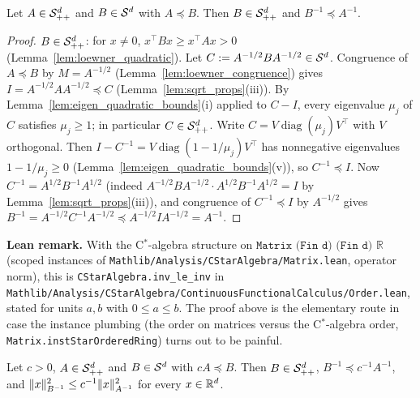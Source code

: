 \begin{lemma}\label{lem:loewner_inv}
\leanok
{}
Let $A \in \mathcal{S}_{++}^{d}$ and $B \in \mathcal{S}^{d}$ with $A \preceq B$. Then $B \in \mathcal{S}_{++}^{d}$ and $B^{-1} \preceq A^{-1}$.
\end{lemma}

\begin{proof}
\leanok
{}
$B \in \mathcal{S}_{++}^{d}$: for $x \ne 0$, $x^\top B x \ge x^\top A x > 0$ (Lemma~\ref{lem:loewner_quadratic}).
Let $C := A^{-1/2} B A^{-1/2} \in \mathcal{S}^{d}$. Congruence of $A \preceq B$ by $M = A^{-1/2}$
(Lemma~\ref{lem:loewner_congruence}) gives $I = A^{-1/2} A A^{-1/2} \preceq C$
(Lemma~\ref{lem:sqrt_props}(iii)). By Lemma~\ref{lem:eigen_quadratic_bounds}(i) applied to
$C - I$, every eigenvalue $\mu_j$ of $C$ satisfies $\mu_j \ge 1$; in particular $C \in \mathcal{S}_{++}^{d}$.
Write $C = V\operatorname{diag}(\mu_j)V^\top$ with $V$ orthogonal. Then
$I - C^{-1} = V\operatorname{diag}(1 - 1/\mu_j)V^\top$ has nonnegative eigenvalues
$1 - 1/\mu_j \ge 0$ (Lemma~\ref{lem:eigen_quadratic_bounds}(v)), so $C^{-1} \preceq I$. Now
$C^{-1} = A^{1/2} B^{-1} A^{1/2}$ (indeed $A^{-1/2}BA^{-1/2}\cdot A^{1/2}B^{-1}A^{1/2} = I$ by
Lemma~\ref{lem:sqrt_props}(iii)), and congruence of $C^{-1} \preceq I$ by $A^{-1/2}$ gives
$B^{-1} = A^{-1/2} C^{-1} A^{-1/2} \preceq A^{-1/2} I A^{-1/2} = A^{-1}$.
\end{proof}

\textbf{Lean remark.} With the C$^*$-algebra structure on $\texttt{Matrix (Fin d) (Fin d) ℝ}$
(scoped instances of \texttt{Mathlib/Analysis/CStarAlgebra/Matrix.lean}, operator norm), this is
\texttt{CStarAlgebra.inv\_le\_inv} in
\texttt{Mathlib/Analysis/CStarAlgebra/ContinuousFunctionalCalculus/Order.lean}, stated for units
$a, b$ with $0 \le a \le b$. The proof above is the elementary route in case the instance
plumbing (the order on matrices versus the C$^*$-algebra order,
\texttt{Matrix.instStarOrderedRing}) turns out to be painful.

\begin{lemma}\label{lem:loewner_scalar}
\leanok
{}
Let $c > 0$, $A \in \mathcal{S}_{++}^{d}$ and $B \in \mathcal{S}^{d}$ with $cA \preceq B$. Then $B \in \mathcal{S}_{++}^{d}$,
$B^{-1} \preceq c^{-1}A^{-1}$, and $\lVert x \rVert_{B^{-1}}^2 \le c^{-1}\lVert x \rVert_{A^{-1}}^2$ for every
$x \in \mathbb{R}^d$.
\end{lemma}

